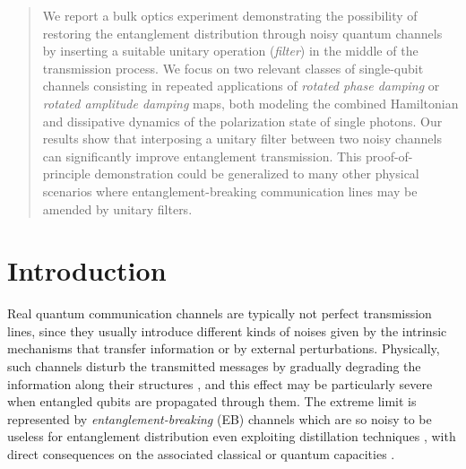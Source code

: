 \documentclass[aps,twocolumn,pra,superscriptaddress,showpacs,showkeys,floatfix]{revtex4-1}
\begin{document}
\begin{abstract}
We report a bulk optics experiment demonstrating the possibility of restoring the entanglement distribution through noisy quantum channels by inserting  a suitable unitary operation ({\it filter}) in the middle of the transmission process. 
We focus on two relevant classes of single-qubit channels  consisting in repeated applications of {\it rotated phase damping} or {\it rotated amplitude damping} maps, both modeling the combined Hamiltonian and dissipative dynamics of the polarization state of single photons. Our results show that interposing a unitary filter between two  noisy channels can significantly improve entanglement transmission. This proof-of-principle demonstration could be generalized to many other physical scenarios where entanglement-breaking communication lines may be amended by unitary filters.  \end{abstract}

\maketitle

\section{Introduction}

Real quantum communication channels are typically not perfect transmission lines, since they usually introduce different kinds of noises given by the intrinsic mechanisms that transfer information or by external perturbations. Physically, such channels disturb the transmitted messages by gradually degrading the information  along their structures \cite{barnum,schumacher,nielsen97}, and this effect may be particularly severe when entangled qubits are propagated through them. The extreme limit is represented by {\it entanglement-breaking} (EB) channels \cite{horodecki2003} which are so noisy to be useless for entanglement distribution even exploiting distillation techniques \cite{bennet1996}, with direct consequences on the associated classical or quantum capacities \cite{channelcapacity}. 
\end{document}
